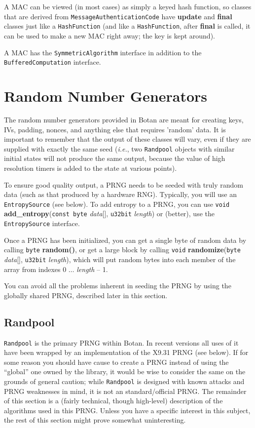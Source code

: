 \documentclass{article}
\newcommand{\function}[1]{\textbf{#1}}
\newcommand{\type}[1]{\texttt{#1}}
\renewcommand{\arg}[1]{\textsl{#1}}
\newcommand{\ie}[0]{\emph{i.e.}}
\begin{document}
A MAC can be viewed (in most cases) as simply a keyed hash function, so classes
that are derived from \type{MessageAuthenticationCode} have \function{update}
and \function{final} classes just like a \type{HashFunction} (and like a
\type{HashFunction}, after \function{final} is called, it can be used to make a
new MAC right away; the key is kept around).

A MAC has the \type{SymmetricAlgorithm} interface in addition to the
\type{BufferedComputation} interface.

\pagebreak
\section{Random Number Generators}

The random number generators provided in Botan are meant for creating keys,
IVs, padding, nonces, and anything else that requires 'random' data. It is
important to remember that the output of these classes will vary, even if they
are supplied with exactly the same seed (\ie, two \type{Randpool} objects with
similar initial states will not produce the same output, because the value of
high resolution timers is added to the state at various points).

To ensure good quality output, a PRNG needs to be seeded with truly random data
(such as that produced by a hardware RNG). Typically, you will use an
\type{EntropySource} (see below). To add entropy to a PRNG, you can use
\type{void} \function{add\_entropy}(\type{const byte} \arg{data}[],
\type{u32bit} \arg{length}) or (better), use the \type{EntropySource}
interface.

Once a PRNG has been initialized, you can get a single byte of random data by
calling \type{byte} \function{random()}, or get a large block by calling
\type{void} \function{randomize}(\type{byte} \arg{data}[], \type{u32bit}
\arg{length}), which will put random bytes into each member of the array from
indexes 0 $\ldots$ \arg{length} -- 1.

You can avoid all the problems inherent in seeding the PRNG by using the
globally shared PRNG, described later in this section.

\subsection{Randpool}

\type{Randpool} is the primary PRNG within Botan. In recent versions all uses
of it have been wrapped by an implementation of the X9.31 PRNG (see below). If
for some reason you should have cause to create a PRNG instead of using the
``global'' one owned by the library, it would be wise to consider the same on
the grounds of general caution; while \type{Randpool} is designed with known
attacks and PRNG weaknesses in mind, it is not an standard/official PRNG. The
remainder of this section is a (fairly technical, though high-level) description
of the algorithms used in this PRNG. Unless you have a specific interest in
this subject, the rest of this section might prove somewhat uninteresting.
\end{document}
